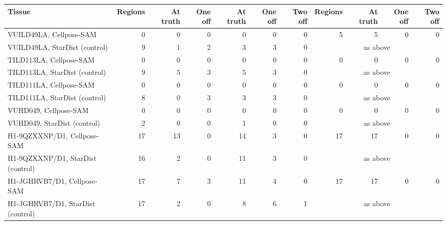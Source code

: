 {\begin{table}[H]
\begin{tabular}{lrrrrrrrrrr}
Tissue & Regions & At truth & One off & At truth & One off & Two off & Regions & At truth & One off & Two off \\
\midrule
VUILD49LA, Cellpose-SAM & 0 & 0 & 0 & 0 & 0 & 0 & 5 & 5 & 0 & 0 \\
VUILD49LA, StarDist (control) & 9 & 1 & 2 & 3 & 3 & 0 & \multicolumn{4}{c}{as above} \\
TILD113LA, Cellpose-SAM & 0 & 0 & 0 & 0 & 0 & 0 & 0 & 0 & 0 & 0 \\
TILD113LA, StarDist (control) & 9 & 5 & 3 & 5 & 3 & 0 & \multicolumn{4}{c}{as above} \\
TILD111LA, Cellpose-SAM & 0 & 0 & 0 & 0 & 0 & 0 & 0 & 0 & 0 & 0 \\
TILD111LA, StarDist (control) & 8 & 0 & 3 & 3 & 3 & 0 & \multicolumn{4}{c}{as above} \\
VUHD049, Cellpose-SAM & 0 & 0 & 0 & 0 & 0 & 0 & 0 & 0 & 0 & 0 \\
VUHD049, StarDist (control) & 2 & 0 & 0 & 1 & 0 & 0 & \multicolumn{4}{c}{as above} \\
H1-9QZXXNP/D1, Cellpose-SAM & 17 & 13 & 0 & 14 & 3 & 0 & 17 & 17 & 0 & 0 \\
H1-9QZXXNP/D1, StarDist (control) & 16 & 2 & 0 & 11 & 3 & 0 & \multicolumn{4}{c}{as above} \\
H1-JGHRVB7/D1, Cellpose-SAM & 17 & 7 & 3 & 11 & 4 & 0 & 17 & 17 & 0 & 0 \\
H1-JGHRVB7/D1, StarDist (control) & 17 & 2 & 0 & 8 & 6 & 1 & \multicolumn{4}{c}{as above} \\
\bottomrule
\end{tabular}
\end{table}
}

